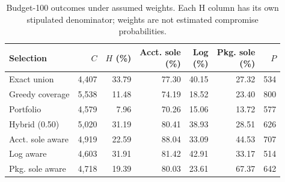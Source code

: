 \begin{table}[!t]
\centering
\footnotesize
\caption{Budget-100 outcomes under assumed weights. Each H column has its own stipulated denominator; weights are not estimated compromise probabilities.}
\label{tab:q1_heterogeneous_weights}
\setlength{\tabcolsep}{2.2pt}
\begin{tabular}{lrrrrrr}
\toprule
Selection & $C$ & \shortstack{$H$\\(\%)} & \shortstack{Acct. sole\\(\%)} & \shortstack{Log\\(\%)} & \shortstack{Pkg. sole\\(\%)} & $P$\\
\midrule
Exact union & 4,407 & 33.79 & 77.30 & 40.15 & 27.32 & 534\\
Greedy coverage & 5,538 & 11.48 & 74.19 & 18.52 & 23.40 & 800\\
Portfolio & 4,579 & 7.96 & 70.26 & 15.06 & 13.72 & 577\\
Hybrid (0.50) & 5,020 & 31.19 & 80.41 & 38.93 & 28.51 & 626\\
Acct. sole aware & 4,919 & 22.59 & 88.04 & 33.09 & 44.53 & 707\\
Log aware & 4,603 & 31.91 & 81.42 & 42.91 & 33.17 & 514\\
Pkg. sole aware & 4,718 & 19.39 & 80.03 & 23.61 & 67.37 & 642\\
\bottomrule
\end{tabular}
\end{table}
